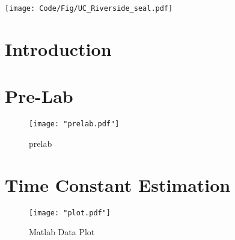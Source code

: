 \documentclass[12pt]{article}
\begin{document}
\begin{titlepage}
		\newcommand*{\plogo}{\texttt{[image: Code/Fig/UC\_Riverside\_seal.pdf]}}
		
		\plogo\\[1cm] %
		
		
		\vfill %
	\end{titlepage}
	
	\newpage
	
	\tableofcontents
	\pagebreak
	\listoffigures
	\lstlistoflistings  
	\pagebreak
	
	
	\section{Introduction}
	
	\section{Pre-Lab}
		\begin{figure}[H]
			\centering
			\texttt{[image: "prelab.pdf"]}
			\caption{prelab}
			\label{fig:prelab}
		\end{figure}
	
	\section{Time Constant Estimation}
			
		\begin{figure}[H]
			\centering
			\texttt{[image: "plot.pdf"]}
			\caption{Matlab Data Plot}
			\label{fig:}
		\end{figure}
		
\end{document}

